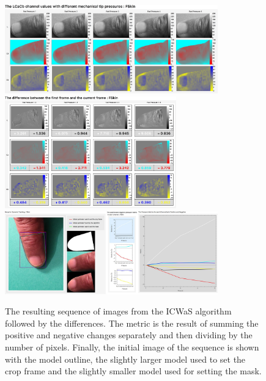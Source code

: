 \begin{figure}[h!]
  \centering
    \includegraphics[width=0.820\textwidth]{Chapter4/Figs/Final_Fig_Channels_FSkin.jpg}
    \includegraphics[width=0.660\textwidth]{Chapter4/Figs/Final_Fig_Total_Difference_FSkin.jpg}
    \includegraphics[width=0.820\textwidth]{Chapter4/Figs/Final_Fig_Misc_FSkin.jpg}
        \caption{The resulting sequence of images from the ICWaS algorithm followed by the differences. The metric is the result of summing the positive and negative changes separately and then dividing by the number of pixels. Finally, the initial image of the sequence is shown with the model outline, the slightly larger model used to set the crop frame and the slightly smaller model used for setting the mask.}\label{fig:ICWaSResultFSkin}
\end{figure}


